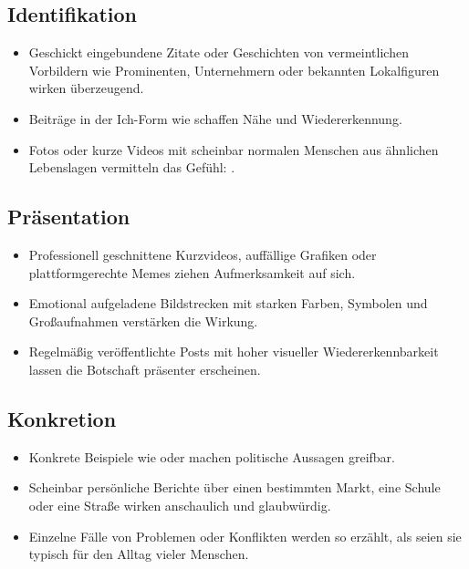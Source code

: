 \subsection{Identifikation}
\label{sec:04-05-02_identification}

\begin{itemize}
    \item Geschickt eingebundene Zitate oder Geschichten von vermeintlichen Vorbildern wie Prominenten, Unternehmern oder bekannten Lokalfiguren wirken überzeugend.
    \item Beiträge in der Ich-Form wie  schaffen Nähe und Wiedererkennung.
    \item Fotos oder kurze Videos mit scheinbar normalen Menschen aus ähnlichen Lebenslagen vermitteln das Gefühl: .
\end{itemize}

\subsection{Präsentation}
\label{sec:04-05-03_presentation}

\begin{itemize}
    \item Professionell geschnittene Kurzvideos, auffällige Grafiken oder plattformgerechte Memes ziehen Aufmerksamkeit auf sich.
    \item Emotional aufgeladene Bildstrecken mit starken Farben, Symbolen und Großaufnahmen verstärken die Wirkung.
    \item Regelmäßig veröffentlichte Posts mit hoher visueller Wiedererkennbarkeit lassen die Botschaft präsenter erscheinen.
\end{itemize}

\subsection{Konkretion}
\label{sec:04-05-04_concretion}

\begin{itemize}
    \item Konkrete Beispiele wie  oder  machen politische Aussagen greifbar.
    \item Scheinbar persönliche Berichte über einen bestimmten Markt, eine Schule oder eine Straße wirken anschaulich und glaubwürdig.
    \item Einzelne Fälle von Problemen oder Konflikten werden so erzählt, als seien sie typisch für den Alltag vieler Menschen.
\end{itemize}

